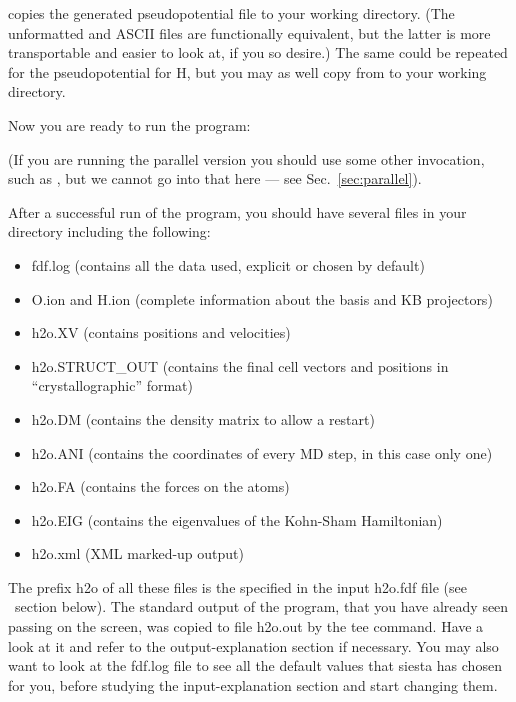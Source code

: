
\noindent
copies the generated pseudopotential file to your working directory.
(The unformatted and ASCII files are functionally equivalent, but
the latter is more transportable and easier to look at, if you so
desire.) The same could be repeated for the pseudopotential for H,
but you may as well copy  from 
to your  working directory.

\noindent
Now you are ready to run the program:


\noindent
(If you are running the parallel version you should use some other
invocation, such as , but we cannot
go into that here --- see Sec.~\ref{sec:parallel}).

After a successful run of the program, you should have several
files in your directory including the following:
\begin{itemize}

\item fdf.log
 (contains all the data used, explicit or chosen by default)
\item O.ion and H.ion
 (complete information about the basis and KB projectors)
\item h2o.XV
 (contains positions and velocities)
\item h2o.STRUCT\_OUT
 (contains the final cell vectors and positions in
 ``crystallographic'' format)
\item h2o.DM
 (contains the density matrix to allow a restart)
\item h2o.ANI
 (contains the coordinates of every MD step, in this case only one)
\item h2o.FA
 (contains the forces on the atoms)
\item h2o.EIG
 (contains the eigenvalues of the Kohn-Sham Hamiltonian)
\item h2o.xml
 (XML marked-up output)
\end{itemize}

The prefix h2o of all these files is the 
specified in the input h2o.fdf file (see \fdflib\ section below).
The standard output of the program, that you
have already seen passing on the screen, was copied to
file h2o.out by the tee command. Have a look at it
and refer to the output-explanation section if necessary.
You may also want to look at the fdf.log file to see all
the default values that siesta has chosen for you, before
studying the input-explanation section and start changing them.

